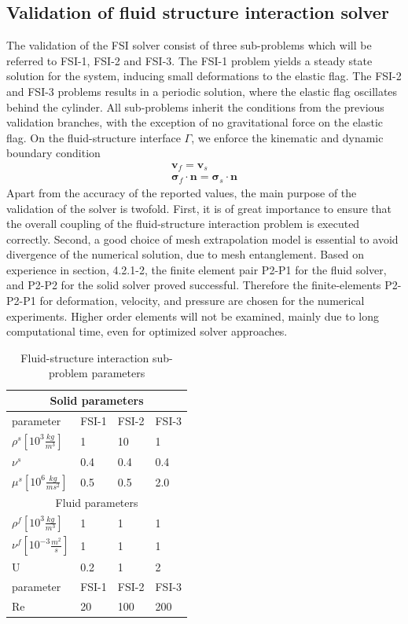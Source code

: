 \subsection{Validation of fluid structure interaction solver}
\label{sec:fsi3}
The validation of the FSI solver consist of three sub-problems which will be referred to FSI-1, FSI-2 and FSI-3. The FSI-1 problem yields a steady state solution for the system, inducing small deformations to the elastic flag. The FSI-2 and FSI-3 problems results in a periodic solution, where the elastic flag oscillates behind the cylinder. All sub-problems inherit the conditions from the previous validation branches, with the exception of no gravitational force on the elastic flag. On the fluid-structure interface $\Gamma$, we enforce the kinematic and dynamic boundary condition
\begin{align}
\mathbf{v}_f = \mathbf{v}_s \\
\mathbf{\sigma}_f \cdot \mathbf{n} = \mathbf{\sigma}_s \cdot \mathbf{n}
\end{align}
Apart from the accuracy of the reported values, the main purpose of the validation of the solver is twofold. First, it is of great importance to ensure that the overall coupling of the fluid-structure interaction problem is executed correctly. Second, a good choice of mesh extrapolation model is essential to avoid divergence of the numerical solution, due to mesh entanglement.  Based on experience in section, 4.2.1-2, the finite element pair P2-P1 for the fluid solver, and P2-P2 for the solid solver proved successful. Therefore the finite-elements P2-P2-P1 for deformation, velocity, and pressure are chosen for the numerical experiments. Higher order elements will not be examined, mainly due to long computational time, even for optimized solver approaches.

\newpage

\begin{table}[h!]
\centering
\label{my-label}
\begin{tabular}{ |p{3cm}||p{2cm}|p{2cm}|p{2cm}|  }
 \hline
 \multicolumn{4}{|c|}{Solid parameters} \\
 \hline
 parameter              & FSI-1 & FSI-2 & FSI-3 \\
 \hline
 $\rho^s [10^{3} \frac{kg}{m^3}]$ & 1    & 10   & 1    \\
$\nu^s$ & 0.4  & 0.4  & 0.4  \\
$\mu^s  [10^{6}\frac{kg}{ms^2}]$  & 0.5  & 0.5  & 2.0  \\
 \hline
 \multicolumn{4}{|c|}{Fluid parameters} \\
 \hline
$\rho^f [10^{3}\frac{kg}{m^3}]$ & 1    & 1    & 1    \\
$\nu^f  [10^{-3}\frac{m^2}{s}]$  & 1    & 1    & 1    \\
U                      & 0.2  & 1    & 2    \\
parameter              & FSI-1 & FSI-2 & FSI-3 \\
Re                     & 20   & 100  & 200 \\
\hline
\end{tabular}
\caption{Fluid-structure interaction sub-problem parameters}
\end{table}

